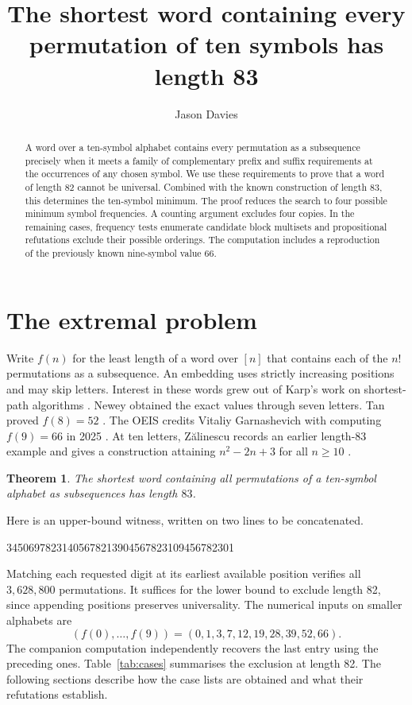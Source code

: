 \documentclass[11pt]{article}
\title{The shortest word containing every permutation of ten symbols has length 83}
\author{Jason Davies}
\date{}
\newtheorem{theorem}{Theorem}
\begin{document}
\maketitle
\begin{abstract}
A word over a ten-symbol alphabet contains every permutation as a subsequence precisely when it meets a family of complementary prefix and suffix requirements at the occurrences of any chosen symbol. We use these requirements to prove that a word of length 82 cannot be universal. Combined with the known construction of length 83, this determines the ten-symbol minimum. The proof reduces the search to four possible minimum symbol frequencies. A counting argument excludes four copies. In the remaining cases, frequency tests enumerate candidate block multisets and propositional refutations exclude their possible orderings. The computation includes a reproduction of the previously known nine-symbol value 66.
\end{abstract}

\section{The extremal problem}
Write $f(n)$ for the least length of a word over $[n]$ that contains each of the $n!$ permutations as a subsequence. An embedding uses strictly increasing positions and may skip letters. Interest in these words grew out of Karp's work on shortest-path algorithms \cite{newey,adleman}. Newey obtained the exact values through seven letters. Tan proved $f(8)=52$ \cite{tan}. The OEIS credits Vitaliy Garnashevich with computing $f(9)=66$ in 2025 \cite{oeis,garnashevich}. At ten letters, Z\u{a}linescu records an earlier length-83 example and gives a construction attaining $n^2-2n+3$ for all $n\ge10$ \cite{zalinescu}.

\begin{theorem}\label{thm:main}
The shortest word containing all permutations of a ten-symbol alphabet as subsequences has length $83$.
\end{theorem}
Here is an upper-bound witness, written on two lines to be concatenated.
\begin{center}\par
34506978231405678213904567823109456782301
\end{center}
Matching each requested digit at its earliest available position verifies all $3{,}628{,}800$ permutations. It suffices for the lower bound to exclude length 82, since appending positions preserves universality. The numerical inputs on smaller alphabets are
\[
(f(0),\ldots,f(9))=(0,1,3,7,12,19,28,39,52,66).
\]
The companion computation independently recovers the last entry using the preceding ones. Table~\ref{tab:cases} summarises the exclusion at length 82. The following sections describe how the case lists are obtained and what their refutations establish.
\end{document}
